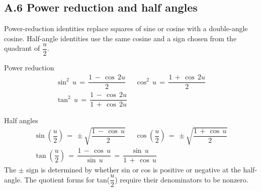 \documentclass[11pt]{article}
\begin{document}
\begin{keepsection}
\section{A.6 Power reduction and half angles}

Power-reduction identities replace squares of sine or cosine with a double-angle cosine. Half-angle identities use the same cosine and a sign chosen from the quadrant of {\small\ensuremath{\dfrac{{u}}{2}}}.

\begin{equationcard}{Power reduction}
\[ \begin{gathered} \sin ^{2}\, {u}\, =\, \dfrac{1\, -\, \cos \, 2{u}}{2}\, \quad \, \cos ^{2}\, {u}\, =\, \dfrac{1\, +\, \cos \, 2{u}}{2} \\ \tan ^{2}\, {u}\, =\, \dfrac{1\, -\, \cos \, 2{u}}{1\, +\, \cos \, 2{u}} \end{gathered} \]
\end{equationcard}

\begin{equationcard}{Half angles}
\[ \begin{gathered} \sin \left(\dfrac{{u}}{2}\right)\, =\, \pm \sqrt{\dfrac{1\, -\, \cos \, {u}}{2}}\, \quad \, \cos \left(\dfrac{{u}}{2}\right)\, =\, \pm \sqrt{\dfrac{1\, +\, \cos \, {u}}{2}} \\ \tan \left(\dfrac{{u}}{2}\right)\, =\, \dfrac{1\, -\, \cos \, {u}}{\sin \, {u}}\, =\, \dfrac{\sin \, {u}}{1\, +\, \cos \, {u}} \end{gathered} \]
{\small The \ensuremath{\pm} sign is determined by whether sin or cos is positive or negative at the half-angle. The quotient forms for tan({\small\ensuremath{\dfrac{{u}}{2}}}) require their denominators to be nonzero.}
\end{equationcard}
\end{keepsection}
\end{document}
